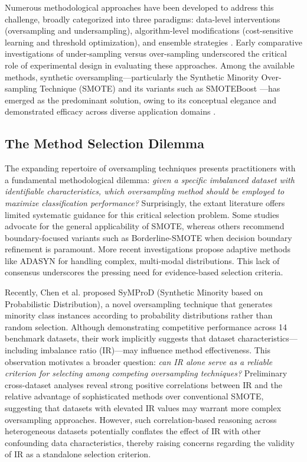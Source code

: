 \documentclass[12pt,a4paper]{article}
\theoremstyle{definition}
\begin{document}
Numerous methodological approaches have been developed to address this challenge, broadly categorized into three paradigms: data-level interventions (oversampling and undersampling), algorithm-level modifications (cost-sensitive learning and threshold optimization), and ensemble strategies \cite{chawla2002smote,he2008adasyn,ling1998decision,galar2012review}. Early comparative investigations of under-sampling versus over-sampling \cite{drummond2003c4,estabrooks2004multiple} underscored the critical role of experimental design in evaluating these approaches. Among the available methods, synthetic oversampling---particularly the Synthetic Minority Over-sampling Technique (SMOTE) and its variants such as SMOTEBoost \cite{chawla2003smoteboost}---has emerged as the predominant solution, owing to its conceptual elegance and demonstrated efficacy across diverse application domains \cite{fernandez2018smote,vluymans2019class}.

\subsection{The Method Selection Dilemma}
The expanding repertoire of oversampling techniques presents practitioners with a fundamental methodological dilemma: \textit{given a specific imbalanced dataset with identifiable characteristics, which oversampling method should be employed to maximize classification performance?} Surprisingly, the extant literature offers limited systematic guidance for this critical selection problem. Some studies advocate for the general applicability of SMOTE, whereas others recommend boundary-focused variants such as Borderline-SMOTE when decision boundary refinement is paramount. More recent investigations propose adaptive methods like ADASYN for handling complex, multi-modal distributions. This lack of consensus underscores the pressing need for evidence-based selection criteria.

Recently, Chen et al. \cite{chen2023symprod} proposed SyMProD (Synthetic Minority based on Probabilistic Distribution), a novel oversampling technique that generates minority class instances according to probability distributions rather than random selection. Although demonstrating competitive performance across 14 benchmark datasets, their work implicitly suggests that dataset characteristics---including imbalance ratio (IR)---may influence method effectiveness. This observation motivates a broader question: \textit{can IR alone serve as a reliable criterion for selecting among competing oversampling techniques?} Preliminary cross-dataset analyses reveal strong positive correlations between IR and the relative advantage of sophisticated methods over conventional SMOTE, suggesting that datasets with elevated IR values may warrant more complex oversampling approaches. However, such correlation-based reasoning across heterogeneous datasets potentially conflates the effect of IR with other confounding data characteristics, thereby raising concerns regarding the validity of IR as a standalone selection criterion.
\end{document}
